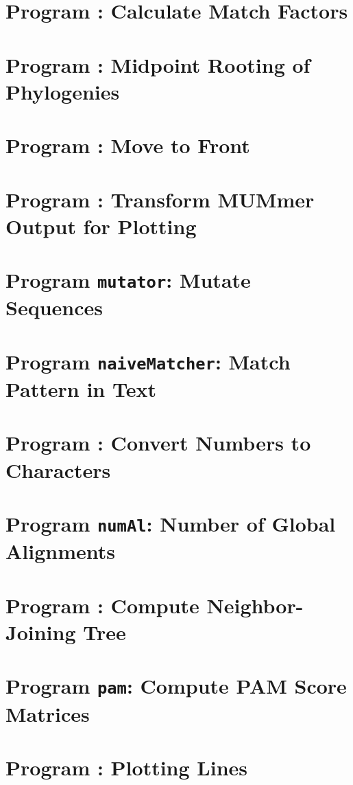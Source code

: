 \documentclass[a4paper]{report}
\begin{document}
\chapter{Program : Calculate Match Factors}\label{ch:ma}

\chapter{Program : Midpoint Rooting of
  Phylogenies}\label{ch:mr}

\chapter{Program : Move to Front}\label{ch:mt}

\chapter{Program : Transform MUMmer Output for
  Plotting}\label{ch:m2p}

\chapter{Program \texttt{mutator}: Mutate Sequences}\label{ch:mut}

\chapter{Program \texttt{naiveMatcher}: Match Pattern in
  Text}\label{ch:nm}

\chapter{Program : Convert Numbers to Characters}\label{ch:n2c}

\chapter{Program \texttt{numAl}: Number of Global
  Alignments}\label{ch:num}

\chapter{Program : Compute Neighbor-Joining Tree}\label{ch:nj}

\chapter{Program \texttt{pam}: Compute PAM Score
  Matrices}\label{ch:pam}

\chapter{Program : Plotting Lines}\label{ch:pl}

\end{document}

